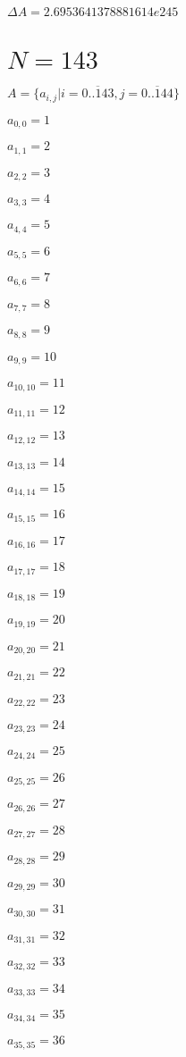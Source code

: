 \documentclass[a4paper,12pt]{article}
\begin{document}
$\Delta A = 2.6953641378881614e245$



\section{ $N = 143$ }
$A = \{ a _{ i, j } | i = \overline { 0..143 }, j = \overline { 0..144 } \}$

$a _{ 0, 0 } = 1$

$a _{ 1, 1 } = 2$

$a _{ 2, 2 } = 3$

$a _{ 3, 3 } = 4$

$a _{ 4, 4 } = 5$

$a _{ 5, 5 } = 6$

$a _{ 6, 6 } = 7$

$a _{ 7, 7 } = 8$

$a _{ 8, 8 } = 9$

$a _{ 9, 9 } = 10$

$a _{ 10, 10 } = 11$

$a _{ 11, 11 } = 12$

$a _{ 12, 12 } = 13$

$a _{ 13, 13 } = 14$

$a _{ 14, 14 } = 15$

$a _{ 15, 15 } = 16$

$a _{ 16, 16 } = 17$

$a _{ 17, 17 } = 18$

$a _{ 18, 18 } = 19$

$a _{ 19, 19 } = 20$

$a _{ 20, 20 } = 21$

$a _{ 21, 21 } = 22$

$a _{ 22, 22 } = 23$

$a _{ 23, 23 } = 24$

$a _{ 24, 24 } = 25$

$a _{ 25, 25 } = 26$

$a _{ 26, 26 } = 27$

$a _{ 27, 27 } = 28$

$a _{ 28, 28 } = 29$

$a _{ 29, 29 } = 30$

$a _{ 30, 30 } = 31$

$a _{ 31, 31 } = 32$

$a _{ 32, 32 } = 33$

$a _{ 33, 33 } = 34$

$a _{ 34, 34 } = 35$

$a _{ 35, 35 } = 36$
\end{document}
